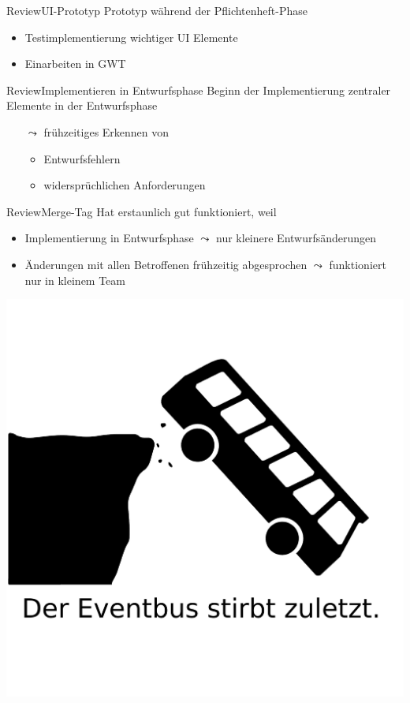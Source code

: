 \documentclass[10pt]{beamer}
\begin{document}
\begin{frame}{Review}{UI-Prototyp}
Prototyp während der Pflichtenheft-Phase
	\begin{itemize}
		\item Testimplementierung wichtiger UI Elemente
		\item Einarbeiten in GWT
	\end{itemize}
\end{frame}

\begin{frame}{Review}{Implementieren in Entwurfsphase}
Beginn der Implementierung zentraler Elemente in der Entwurfsphase 
	\begin{itemize}
		\item[$\leadsto$] frühzeitiges Erkennen von 
		\begin{itemize}
			\item Entwurfsfehlern
			\item widersprüchlichen Anforderungen
		\end{itemize}
	\end{itemize}
\end{frame}

\begin{frame}{Review}{Merge-Tag}
Hat erstaunlich gut funktioniert, weil
	\begin{itemize}
		\item Implementierung in Entwurfsphase $\leadsto$ nur kleinere Entwurfsänderungen %
		\item Änderungen mit allen Betroffenen frühzeitig abgesprochen $\leadsto$ funktioniert nur in kleinem Team
	\end{itemize}
\end{frame}



{\1
\begin{frame}
  \includegraphics[width = \textwidth]{img/eventbus}
\end{frame}}
\end{document}
